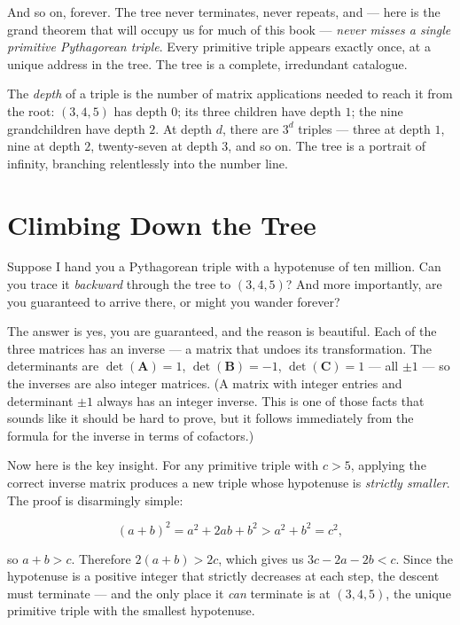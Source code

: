 \documentclass[11pt,twoside,openright]{book}
\theoremstyle{definition}
\theoremstyle{remark}
\begin{document}
And so on, forever. The tree never terminates, never repeats, and --- here is the grand theorem that will occupy us for much of this book --- \textit{never misses a single primitive Pythagorean triple}. Every primitive triple appears exactly once, at a unique address in the tree. The tree is a complete, irredundant catalogue.


The \textit{depth} of a triple is the number of matrix applications needed to reach it from the root: $(3,4,5)$ has depth $0$; its three children have depth $1$; the nine grandchildren have depth $2$. At depth $d$, there are $3^d$ triples --- three at depth $1$, nine at depth $2$, twenty-seven at depth $3$, and so on. The tree is a portrait of infinity, branching relentlessly into the number line.


\section{Climbing Down the Tree}

Suppose I hand you a Pythagorean triple with a hypotenuse of ten million. Can you trace it \textit{backward} through the tree to $(3, 4, 5)$? And more importantly, are you guaranteed to arrive there, or might you wander forever?

The answer is yes, you are guaranteed, and the reason is beautiful. Each of the three matrices has an inverse --- a matrix that undoes its transformation. The determinants are $\det(\mathbf{A}) = 1$, $\det(\mathbf{B}) = -1$, $\det(\mathbf{C}) = 1$ --- all $\pm 1$ --- so the inverses are also integer matrices. (A matrix with integer entries and determinant $\pm 1$ always has an integer inverse. This is one of those facts that sounds like it should be hard to prove, but it follows immediately from the formula for the inverse in terms of cofactors.)

Now here is the key insight. For any primitive triple with $c > 5$, applying the correct inverse matrix produces a new triple whose hypotenuse is \textit{strictly smaller}. The proof is disarmingly simple:

\[(a + b)^2 = a^2 + 2ab + b^2 > a^2 + b^2 = c^2,\]

so $a + b > c$. Therefore $2(a + b) > 2c$, which gives us $3c - 2a - 2b < c$. Since the hypotenuse is a positive integer that strictly decreases at each step, the descent must terminate --- and the only place it \textit{can} terminate is at $(3, 4, 5)$, the unique primitive triple with the smallest hypotenuse.
\end{document}
